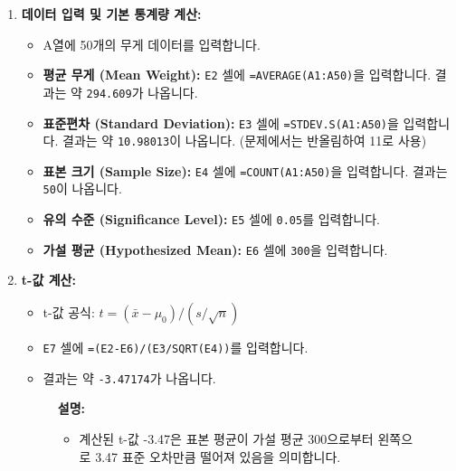 \documentclass[11pt,a4paper]{article}
\theoremstyle{definition}
\begin{document}
\begin{enumerate}
    \item \textbf{데이터 입력 및 기본 통계량 계산:}
    \begin{itemize}
        \item A열에 50개의 무게 데이터를 입력합니다.
        \item \textbf{평균 무게 (Mean Weight):} \texttt{E2} 셀에 \texttt{=AVERAGE(A1:A50)}을 입력합니다. 결과는 약 \texttt{294.609}가 나옵니다.
        \item \textbf{표준편차 (Standard Deviation):} \texttt{E3} 셀에 \texttt{=STDEV.S(A1:A50)}을 입력합니다. 결과는 약 \texttt{10.98013}이 나옵니다. (문제에서는 반올림하여 11로 사용)
        \item \textbf{표본 크기 (Sample Size):} \texttt{E4} 셀에 \texttt{=COUNT(A1:A50)}을 입력합니다. 결과는 \texttt{50}이 나옵니다.
        \item \textbf{유의 수준 (Significance Level):} \texttt{E5} 셀에 \texttt{0.05}를 입력합니다.
        \item \textbf{가설 평균 (Hypothesized Mean):} \texttt{E6} 셀에 \texttt{300}을 입력합니다.
    \end{itemize}

    \item \textbf{t-값 계산:}
    \begin{itemize}
        \item t-값 공식: $t = (\bar{x} - \mu_0) / (s / \sqrt{n})$
        \item \texttt{E7} 셀에 \texttt{=(E2-E6)/(E3/SQRT(E4))}를 입력합니다.
        \item 결과는 약 \texttt{-3.47174}가 나옵니다.
    \end{itemize}
    \begin{figure}[h!]
        \centering
        \label{fig:excel_t_value}
        \vspace{0.5em}
        \textbf{설명:}
        \begin{itemize}
            \item 계산된 t-값 -3.47은 표본 평균이 가설 평균 300으로부터 왼쪽으로 3.47 표준 오차만큼 떨어져 있음을 의미합니다.
        \end{itemize}
    \end{figure}


\end{enumerate}
\end{document}
